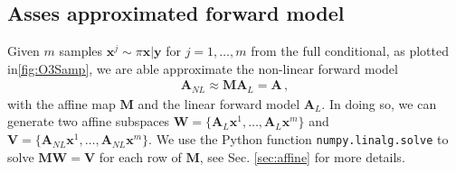 %
\subsection{Asses approximated forward model}
Given $m$ samples $\bm{x}^{j} \sim \pi{\bm{x}|\bm{y}}$ for $j = 1, \dots,m$ from the full conditional, as plotted in\ref{fig:O3Samp}, we are able approximate the non-linear forward model
\begin{align}
	\bm{A}_{NL} \approx \bm{M A}_L = \bm{A} \, ,
\end{align}
with the affine map $\bm{M}$ and the linear forward model $\bm{A}_L$.
In doing so, we can generate two affine subspaces $\bm{W} = \{\bm{A}_L\bm{x}^1, \dots, \bm{A}_L\bm{x}^m \}$ and $\bm{V} = \{\bm{A}_{NL}\bm{x}^1, \dots, \bm{A}_{NL}\bm{x}^m \}$.
We use the Python function \texttt{numpy.linalg.solve} to solve $ \bm{M}\bm{W} = \bm{V}$ for each row of $ \bm{M}$, see Sec. \ref{sec:affine} for more details.



